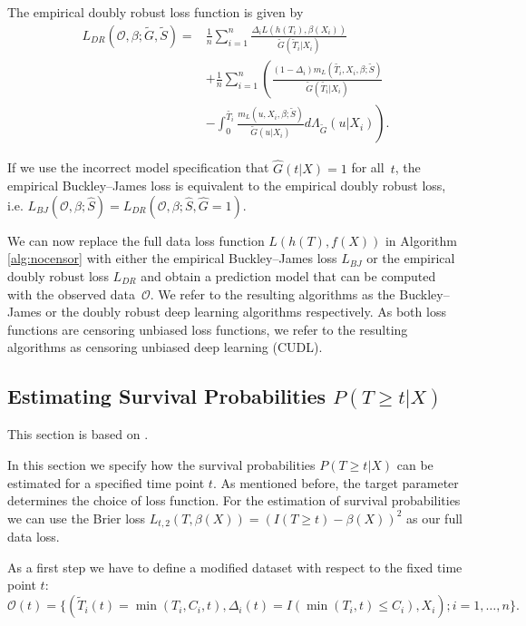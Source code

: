 \documentclass[12pt, a4paper]{scrartcl}
\theoremstyle{definition}
\theoremstyle{plain}
\numberwithin{equation}{section}
\numberwithin{figure}{section}
\numberwithin{table}{section}
\begin{document}
	The empirical doubly robust loss function is given by
	\begin{equation*}
	\begin{split}
	L_{DR}(\mathcal{O}, \beta; \tilde{G}, \tilde{S}) \mathrel{=} & \frac{1}{n} \sum_{i=1}^n \frac{\Delta_i L(h(T_i),\beta(X_i))}{\tilde{G}(\tilde{T}_i\vert X_i)}\\
	~ & + \frac{1}{n} \sum_{i=1}^n \left(\frac{(1-\Delta_i)m_L(\tilde{T_i}, X_i, \beta; \tilde{S})}{\tilde{G}(\tilde{T_i}\vert X_i)} \right.\\
	& - \left. \int _0^{\tilde{T_i}} \frac{m_L(u, X_i, \beta; \tilde{S})}{\tilde{G}(u \vert X_i)} d \Lambda_{\tilde{G}}(u \vert X_i) \right).
	\end{split}
	\end{equation*}
	
	If we use the incorrect model specification that $\hat{G}(t\vert X)=1$ for all~$t$, the empirical  Buckley--James loss is equivalent to the empirical doubly robust loss, i.e. $L_{BJ}(\mathcal{O}, \beta; \hat{S})=L_{DR}(\mathcal{O}, \beta; \hat{S}, \hat{G} = 1)$.
		
	We can now replace the full data loss function $L(h(T), f(X))$ in Algorithm \ref{alg:nocensor} with either the empirical Buckley--James loss $L_{BJ}$ or the empirical doubly robust loss $L_{DR}$ and obtain a prediction model that can be computed with the observed data~$\mathcal{O}$.
	We refer to the resulting algorithms as the Buckley--James or the doubly robust deep learning algorithms respectively.
	As both loss functions are censoring unbiased loss functions, we refer to the resulting algorithms as censoring unbiased deep learning (CUDL). 
	
	\subsection{Estimating Survival Probabilities $P(T\geq t \vert X)$}
	
	This section is based on \citet*{basearticle}.
	
	In this section we specify how the survival probabilities $P(T\geq t \vert X)$ can be estimated for a specified time point $t$.
	As mentioned before, the target parameter determines the choice of loss function.
	For the estimation of survival probabilities we can use the Brier loss $L_{t,2}(T, \beta(X)) = (I(T \geq t) - \beta(X))^2$ as our full data loss.
	
	As a first step we have to define a modified dataset with respect to the fixed time point $t$:
	\begin{equation*}
		\mathcal{O}(t) = \{(\tilde{T}_i(t)=\min(T_i, C_i, t), \Delta_i(t) = I(\min(T_i, t) \leq C_i), X_i); i = 1,\dots,n\}.
	\end{equation*}
	
\end{document}
